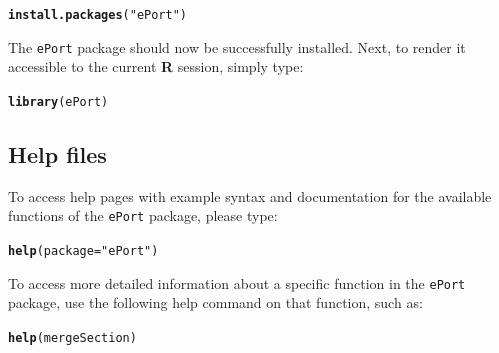 \documentclass{article}\usepackage[]{graphicx}\usepackage[]{color}
\makeatletter
\newcommand{\hlstr}[1]{\textcolor[rgb]{0.192,0.494,0.8}{#1}}%
\newcommand{\hlstd}[1]{\textcolor[rgb]{0.345,0.345,0.345}{#1}}%
\newcommand{\hlkwc}[1]{\textcolor[rgb]{0.333,0.667,0.333}{#1}}%
\newcommand{\hlkwd}[1]{\textcolor[rgb]{0.737,0.353,0.396}{\textbf{#1}}}%
\newenvironment{kframe}{%
 \def\at@end@of@kframe{}%
 \ifinner\ifhmode%
  \def\at@end@of@kframe{\end{minipage}}%
  \begin{minipage}{\columnwidth}%
 \fi\fi%
 \def\FrameCommand##1{\hskip\@totalleftmargin \hskip-\fboxsep
 \colorbox{shadecolor}{##1}\hskip-\fboxsep
     \hskip-\linewidth \hskip-\@totalleftmargin \hskip\columnwidth}%
 \MakeFramed {\advance\hsize-\width
   \@totalleftmargin\z@ \linewidth\hsize
   \@setminipage}}%
 {\par\unskip\endMakeFramed%
 \at@end@of@kframe}
\newenvironment{knitrout}{}{} %
\numberwithin{equation}{section} %
\newcommand{\pkg}[1]{{\texttt{#1}}}
\makeatother
\begin{document}
\begin{knitrout}
\color{fgcolor}\begin{kframe}
\begin{alltt}
\hlkwd{install.packages}\hlstd{(}\hlstr{"ePort"}\hlstd{)}
\end{alltt}
\end{kframe}
\end{knitrout}

\noindent
The \pkg{ePort} package should now be successfully installed. Next, to render it accessible to the current \textbf{\textsf{R}} session, simply type: \\

\begin{knitrout}
\color{fgcolor}\begin{kframe}
\begin{alltt}
\hlkwd{library}\hlstd{(ePort)}
\end{alltt}
\end{kframe}
\end{knitrout}

\subsection{Help files}
\label{sec:helpSection}

To access help pages with example syntax and documentation for the available functions of the \pkg{ePort} package, please type: \\

\begin{knitrout}
\color{fgcolor}\begin{kframe}
\begin{alltt}
\hlkwd{help}\hlstd{(}\hlkwc{package}\hlstd{=}\hlstr{"ePort"}\hlstd{)}
\end{alltt}
\end{kframe}
\end{knitrout}

To access more detailed information about a specific function in the \pkg{ePort} package, use the following help command on that function, such as: \\

\begin{knitrout}
\color{fgcolor}\begin{kframe}
\begin{alltt}
\hlkwd{help}\hlstd{(mergeSection)}
\end{alltt}
\end{kframe}
\end{knitrout}
\end{document}
